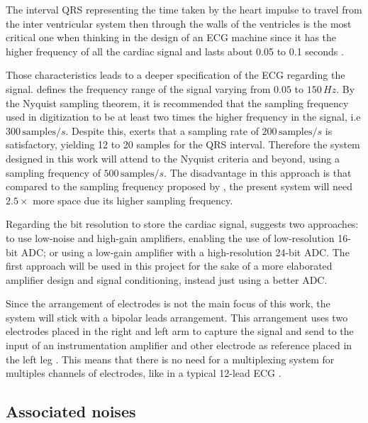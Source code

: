 The interval QRS representing the time taken by the heart impulse to travel from the inter ventricular system then through the walls of the ventricles is the most critical one when thinking in the design of an ECG machine since it has the higher frequency of all the cardiac signal and lasts about 0.05 to 0.1 seconds \cite{khandpur2019compendium}.

Those characteristics leads to a deeper specification of the ECG regarding the signal. \textcite{khandpur2019compendium} defines the frequency range of the signal varying from $0.05$ to $150 \, Hz$. By the Nyquist sampling theorem, it is recommended that the sampling frequency used in digitization to be at least two times the higher frequency in the signal, i.e $300 \, \text{samples}/s$. Despite this, \textcite{khandpur2019compendium} exerts that a sampling rate of $200 \, \text{samples}/s$ is satisfactory, yielding 12 to 20 samples for the QRS interval. Therefore the system designed in this work will attend to the Nyquist criteria and beyond, using a sampling frequency of $500 \, \text{samples}/s$. The disadvantage in this approach is that compared to the sampling frequency proposed by \textcite{khandpur2019compendium}, the present system will need $2.5 \times$ more space due its higher sampling frequency.

Regarding the bit resolution to store the cardiac signal, \textcite{khandpur1987handbook} suggests two approaches: to use low-noise and high-gain amplifiers, enabling the use of low-resolution 16-bit ADC; or using a low-gain amplifier with a high-resolution 24-bit ADC. The first approach will be used in this project for the sake of a more elaborated amplifier design and signal conditioning, instead just using a better ADC.

Since the arrangement of electrodes is not the main focus of this work, the system will stick with a bipolar leads arrangement. This arrangement uses two electrodes placed in the right and left arm to capture the signal and send to the input of an instrumentation amplifier and other electrode as reference placed in the left leg \cite{khandpur2019compendium}. This means that there is no need for a multiplexing system for multiples channels of electrodes, like in a typical 12-lead ECG \cite{zhang201212}.

\subsection{Associated noises}


